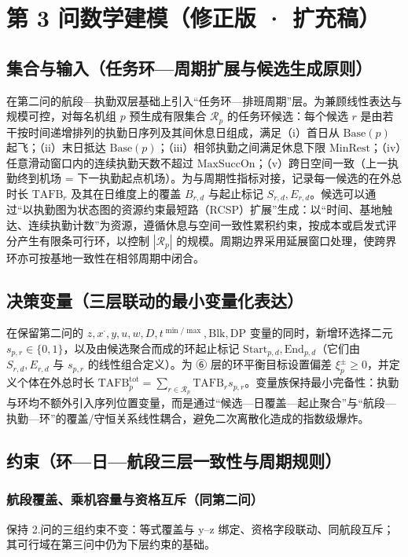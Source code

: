 \documentclass{article}
\begin{document}
\newpage

\section*{第 3 问数学建模（修正版 · 扩充稿）}

\subsection{集合与输入（任务环—周期扩展与候选生成原则）}
在第二问的航段—执勤双层基础上引入“任务环—排班周期”层。为兼顾线性表达与规模可控，对每名机组 $p$ 预生成有限集合 $\mathcal{R}_p$ 的任务环候选：每个候选 $r$ 是由若干按时间递增排列的执勤日序列及其间休息日组成，满足（i）首日从 $\mathrm{Base}(p)$ 起飞；（ii）末日抵达 $\mathrm{Base}(p)$；（iii）相邻执勤之间满足休息下限 $\mathrm{MinRest}$；（iv）任意滑动窗口内的连续执勤天数不超过 $\mathrm{MaxSuccOn}$；（v）跨日空间一致（上一执勤终到机场 = 下一执勤起点机场）。为与周期性指标对接，记录每一候选的在外总时长 $\mathrm{TAFB}_r$ 及其在日维度上的覆盖 $B_{r,d}$ 与起止标记 $S_{r,d}, E_{r,d}$。候选可以通过“以执勤图为状态图的资源约束最短路（RCSP）扩展”生成：以“时间、基地触达、连续执勤计数”为资源，遵循休息与空间一致性累积约束，按成本或启发式评分产生有限条可行环，以控制 $|\mathcal{R}_p|$ 的规模。周期边界采用延展窗口处理，使跨界环亦可按基地一致性在相邻周期中闭合。

\subsection{决策变量（三层联动的最小变量化表达）}
在保留第二问的 $z, x^{\cdot}, y, u, w, D, t^{\min/\max}, \mathrm{Blk}, \mathrm{DP}$ 变量的同时，新增环选择二元 $s_{p,r} \in \{0,1\}$，以及由候选聚合而成的环起止标记 $\mathrm{Start}_{p,d}, \mathrm{End}_{p,d}$（它们由 $S_{r,d}, E_{r,d}$ 与 $s_{p,r}$ 的线性组合定义）。为 ⑥ 层的环平衡目标设置偏差 $\xi_p^{\pm} \ge 0$，并定义个体在外总时长 $\mathrm{TAFB}^{\mathrm{tot}}_{p}=\sum_{r \in \mathcal{R}_p}\mathrm{TAFB}_r s_{p,r}$。变量族保持最小完备性：执勤与环均不额外引入序列位置变量，而是通过“候选—日覆盖—起止聚合”与“航段—执勤—环”的覆盖/守恒关系线性耦合，避免二次离散化造成的指数级爆炸。

\subsection{约束（环—日—航段三层一致性与周期规则）}

\subsubsection{航段覆盖、乘机容量与资格互斥（同第二问）}
保持 2.问的三组约束不变：等式覆盖与 y–z 绑定、资格字段联动、同航段互斥；其可行域在第三问中仍为下层约束的基础。
\end{document}

